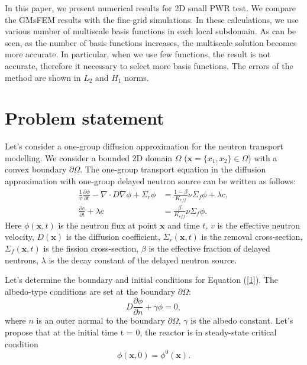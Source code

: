 \documentclass[runningheads]{llncs}
\begin{document}

In this paper, we present numerical results for 2D small PWR test. 
We compare the GMsFEM results with the fine-grid simulations. 
In these calculations, we use various number of multiscale basis functions in each local subdomain. 
As can be seen, as the number of basis functions increases, the multiscale solution becomes more accurate.
In particular, when we use few functions, the result is not accurate, therefore it necessary to select more basis functions. 
The errors of the method are shown in $L_2$ and $H_1$ norms. 

\section{Problem statement}
Let's consider a one-group diffusion approximation for the neutron transport modelling. 
We consider a bounded 2D domain  $\Omega$ ($\bm x = \{x_1, x_2\} \in \Omega$) with a convex boundary $\partial \Omega$. 
The one-group transport equation in the diffusion approximation with one-group delayed neutron source can be written as follows:
\begin{equation}\label{1}
\begin{split}
 \frac{1}{v} \frac{\partial \phi}{\partial t} - \nabla \cdot D \nabla \phi + \Sigma_r \phi &= \frac{1 - \beta}{K_{eff}} \nu \Sigma_f \phi + \lambda c, \\
\frac{\partial c}{\partial t} + \lambda c &= \frac{\beta}{K_{eff}} \nu \Sigma_f \phi.
\end{split}
\end{equation} 
Here $\phi(\bm x,t)$ is the neutron flux  at point $\bm x$ and time $t$,
$v$ is the effective neutron velocity,
$D(\bm x)$ is the diffusion coefficient, 
$\Sigma_r(\bm x,t)$ is the removal cross-section,
$\Sigma_f(\bm x,t)$ is the fission cross-section,
$\beta$ is the effective fraction of delayed neutrons, 
$\lambda$ is the decay constant of the delayed neutron source.

Let's determine the boundary and initial conditions for Equation (\ref{1}).
The albedo-type conditions are set at the boundary  $\partial \Omega$:
\begin{equation}\label{2}
 D\frac{\partial \phi}{\partial n} + \gamma \phi = 0,
\end{equation} 
where $n$ is an outer normal to the boundary $\partial \Omega$, $\gamma$ is the albedo constant.
Let's propose that at the initial time t = 0, the reactor is in steady-state critical condition
\begin{equation}\label{3}
 \phi(\bm x,0) = \phi^0(\bm x).
\end{equation} 
\end{document}

